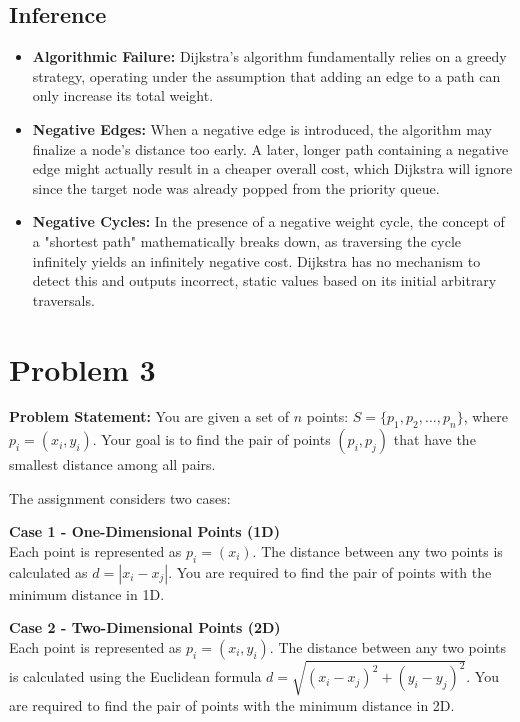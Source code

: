 \documentclass[a4paper,12pt]{article}
\begin{document}
\newpage
\subsection*{Inference}
\begin{itemize}
    \item \textbf{Algorithmic Failure:} Dijkstra's algorithm fundamentally relies on a greedy strategy, operating under the assumption that adding an edge to a path can only increase its total weight. 
    \item \textbf{Negative Edges:} When a negative edge is introduced, the algorithm may finalize a node's distance too early. A later, longer path containing a negative edge might actually result in a cheaper overall cost, which Dijkstra will ignore since the target node was already popped from the priority queue.
    \item \textbf{Negative Cycles:} In the presence of a negative weight cycle, the concept of a "shortest path" mathematically breaks down, as traversing the cycle infinitely yields an infinitely negative cost. Dijkstra has no mechanism to detect this and outputs incorrect, static values based on its initial arbitrary traversals.
\end{itemize}

\newpage

\section*{Problem 3}
\textbf{Problem Statement:} You are given a set of $n$ points: $S=\{p_{1},p_{2},...,p_{n}\}$, where $p_{i}=(x_{i},y_{i})$. Your goal is to find the pair of points $(p_{i},p_{j})$ that have the smallest distance among all pairs.

The assignment considers two cases:

\textbf{Case 1 - One-Dimensional Points (1D)} \\
Each point is represented as $p_{i}=(x_{i})$. The distance between any two points is calculated as $d=|x_{i}-x_{j}|$. You are required to find the pair of points with the minimum distance in 1D.

\textbf{Case 2 - Two-Dimensional Points (2D)} \\
Each point is represented as $p_{i}=(x_{i},y_{i})$. The distance between any two points is calculated using the Euclidean formula $d=\sqrt{(x_{i}-x_{j})^{2}+(y_{i}-y_{j})^{2}}$. You are required to find the pair of points with the minimum distance in 2D.
\end{document}
